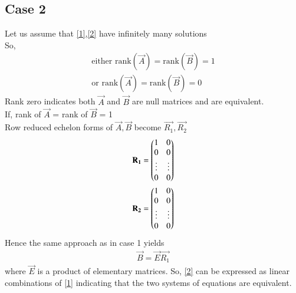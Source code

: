 \documentclass[journal,12pt,twocolumn]{IEEEtran}
\begin{document}
\subsection{Case 2}
Let us assume that \eqref{1},\eqref{2} have infinitely many solutions\\
So,
\begin{align}
\text{either rank}(\vec{A}) = \text{rank}(\vec{B}) = 1 \\
\text{or rank}(\vec{A})= \text{rank}(\vec{B}) = 0
\end{align}
Rank zero indicates both $\vec{A}$ and $\vec{B}$ are null matrices and are equivalent.\\
If, rank of $\vec{A}$ = rank of $\vec{B}$ = 1\\
Row reduced echelon forms of $\vec{A},\vec{B}$ become $\vec{R_1},\vec{R_2}$ 
\begin{align}
    \mathbf{R_1}=\begin{pmatrix}1&0\\0&0\\\vdots&\vdots\\0&0\end{pmatrix}\\
    \mathbf{R_2}=\begin{pmatrix}1&0\\0&0\\\vdots&\vdots\\0&0\end{pmatrix}
\end{align}
Hence the same approach as in case 1 yields
\begin{align}
    \vec{B}=\vec{E}\vec{R_1}
\end{align}
 where $\vec{E}$ is a product of elementary matrices.
So, \eqref{2} can be expressed as linear combinations of \eqref{1} indicating that the two systems of equations are equivalent.
\end{document}
